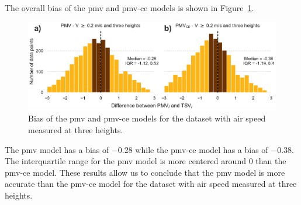 The overall bias of the \ac{pmv} and \ac{pmv-ce} models is shown in Figure~\ref{fig:hist_discrepancies_three_heights}.
\begin{figure}[htb!]
    \centering
    \includegraphics[width=\textwidth]{figures/hist_discrepancies_three_heights}
    \caption{Bias of the \ac{pmv} and \ac{pmv-ce} models for the dataset with air speed measured at three heights.}
    \label{fig:hist_discrepancies_three_heights}
\end{figure}
The \ac{pmv} model has a bias of \num{-.28} while the \ac{pmv-ce} model has a bias of \num{-.38}.
The interquartile range for the \ac{pmv} model is more centered around \num{0} than the \ac{pmv-ce} model.
These results allow us to conclude that the \ac{pmv} model is more accurate than the \ac{pmv-ce} model for the dataset with air speed measured at three heights.